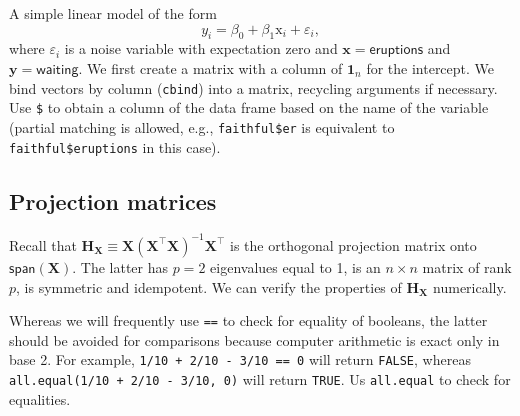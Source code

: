 \documentclass[]{book}
\newenvironment{Shaded}{\begin{snugshade}}{\end{snugshade}}
\newcommand{\KeywordTok}[1]{\textcolor[rgb]{0.13,0.29,0.53}{\textbf{#1}}}
\newcommand{\DecValTok}[1]{\textcolor[rgb]{0.00,0.00,0.81}{#1}}
\newcommand{\StringTok}[1]{\textcolor[rgb]{0.31,0.60,0.02}{#1}}
\newcommand{\CommentTok}[1]{\textcolor[rgb]{0.56,0.35,0.01}{\textit{#1}}}
\newcommand{\OperatorTok}[1]{\textcolor[rgb]{0.81,0.36,0.00}{\textbf{#1}}}
\newcommand{\NormalTok}[1]{#1}
\let\BeginKnitrBlock\begin \let\EndKnitrBlock\end
\begin{document}
A simple linear model of the form
\[y_i = \beta_0 + \beta_1 \mathrm{x}_i + \varepsilon_i,\] where
\(\varepsilon_i\) is a noise variable with expectation zero and
\(\mathbf{x} = \mathsf{eruptions}\) and
\(\boldsymbol{y} = \mathsf{waiting}\). We first create a matrix with a
column of \(\mathbf{1}_n\) for the intercept. We bind vectors by column
(\texttt{cbind}) into a matrix, recycling arguments if necessary. Use
\texttt{\$} to obtain a column of the data frame based on the name of
the variable (partial matching is allowed, e.g., \texttt{faithful\$er}
is equivalent to \texttt{faithful\$eruptions} in this case).

\begin{Shaded}
\end{Shaded}

\subsection{Projection matrices}\label{projection-matrices}

Recall that
\(\mathbf{H}_{\mathbf{X}} \equiv \mathbf{X}(\mathbf{X}^\top\mathbf{X})^{-1}\mathbf{X}^\top\)
is the orthogonal projection matrix onto \(\mathsf{span}(\mathbf{X})\).
The latter has \(p=2\) eigenvalues equal to 1, is an \(n \times n\)
matrix of rank \(p\), is symmetric and idempotent. We can verify the
properties of \(\mathbf{H}_{\mathbf{X}}\) numerically.

\BeginKnitrBlock{rmdcaution}
Whereas we will frequently use \texttt{==} to check for equality of
booleans, the latter should be avoided for comparisons because computer
arithmetic is exact only in base 2. For example,
\texttt{1/10\ +\ 2/10\ -\ 3/10\ ==\ 0} will return \texttt{FALSE},
whereas \texttt{all.equal(1/10\ +\ 2/10\ -\ 3/10,\ 0)} will return
\texttt{TRUE}. Us \texttt{all.equal} to check for equalities.
\EndKnitrBlock{rmdcaution}

\begin{Shaded}
\end{Shaded}
\end{document}
